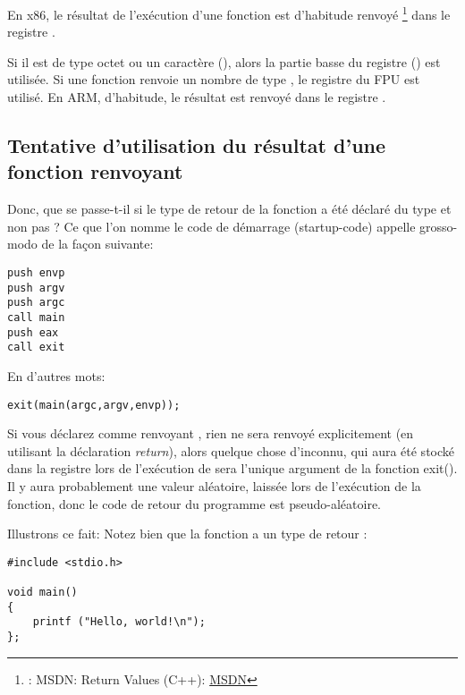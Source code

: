 ﻿


En x86, le résultat de l'exécution d'une fonction est d'habitude renvoyé
\footnote{\Seealso: MSDN: Return Values (C++): \href{http://go.yurichev.com/17258}{MSDN}}
dans le registre \EAX.

Si il est de type octet ou un caractère (\Tchar), alors la partie basse du registre
\EAX (\AL) est utilisée.
Si une fonction renvoie un nombre de type \Tfloat, le registre  du FPU est utilisé. %
En ARM, d'habitude, le résultat est renvoyé dans le registre .

\subsection{Tentative d'utilisation du résultat d'une fonction renvoyant \Tvoid}
\label{UseResultOfVoidFunc}

Donc, que se passe-t-il si le type de retour de la fonction \main a été déclaré
du type \Tvoid et non pas \Tint?
Ce que l'on nomme le code de démarrage (startup-code) appelle \main grosso-modo de
la façon suivante:

\begin{lstlisting}[style=customasmx86]
push envp
push argv
push argc
call main
push eax
call exit
\end{lstlisting}

En d'autres mots:

\begin{lstlisting}[style=customc]
exit(main(argc,argv,envp));
\end{lstlisting}

Si vous déclarez \main comme renvoyant \Tvoid, rien ne sera renvoyé explicitement
(en utilisant la déclaration \emph{return}), alors quelque chose d'inconnu, qui aura
été stocké dans la registre \EAX lors de l'exécution de \main sera l'unique argument
de la fonction exit().
Il y aura probablement une valeur aléatoire, laissée lors de l'exécution de la fonction,
donc le code de retour du programme est pseudo-aléatoire.
\par
Illustrons ce fait:
Notez bien  que la fonction \main a un type de retour \Tvoid:

\begin{lstlisting}[style=customc]
#include <stdio.h>

void main()
{
	printf ("Hello, world!\n");
};
\end{lstlisting}

